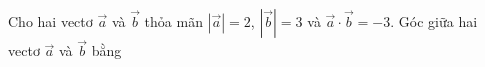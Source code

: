 \begin{ex}
Cho hai vectơ $\vec{a}$ và $\vec{b}$ thỏa mãn $|\vec{a}|=2$, $|\vec{b}|=3$ và $\vec{a}\cdot\vec{b}=-3$. Góc giữa hai vectơ $\vec{a}$ và $\vec{b}$ bằng
\end{ex}

